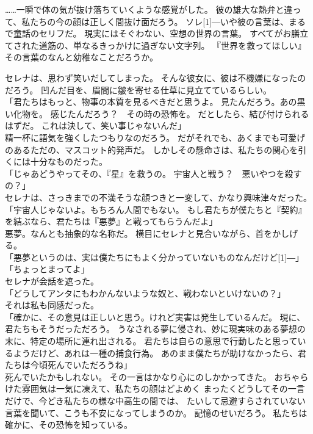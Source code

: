 \documentclass[../IHMain]{subfiles}
\begin{document}
……一瞬で体の気が抜け落ちていくような感覚がした。
彼の雄大な熱弁と違って、私たちの今の顔は正しく間抜け面だろう。
ソレ\scalebox{3}[1]{―}いや彼の言葉は、まるで童話のセリフだ。
現実にはそぐわない、空想の世界の言葉。
すべてがお膳立てされた道筋の、単なるきっかけに過ぎない文字列。
『世界を救ってほしい』その言葉のなんと幼稚なことだろうか。

セレナは、思わず笑いだしてしまった。
そんな彼女に、彼は不機嫌になったのだろう。
凹んだ目を、眉間に皺を寄せる仕草に見立てているらしい。\\
「君たちはもっと、物事の本質を見るべきだと思うよ。
見たんだろう。あの黒い化物を。
感じたんだろう？　その時の恐怖を。
だとしたら、結び付けられるはずだ。
これは決して、笑い事じゃないんだ」\\
精一杯に語気を強くしたつもりなのだろう。
だがそれでも、あくまでも可愛げのあるただの、マスコット的発声だ。
しかしその懸命さは、私たちの関心を引くには十分なものだった。\\
「じゃあどうやってその、『星』を救うの。
宇宙人と戦う？　悪いやつを殺すの？」\\
セレナは、さっきまでの不満そうな顔つきと一変して、かなり興味津々だった。\\
「宇宙人じゃないよ。もちろん人間でもない。
もし君たちが僕たちと『契約』を結ぶなら、君たちは『悪夢』と戦ってもらうんだよ」\\
悪夢。なんとも抽象的な名称だ。
横目にセレナと見合いながら、首をかしげる。\\
「悪夢というのは、実は僕たちにもよく分かっていないものなんだけど\scalebox{3}[1]{―}」\\
「ちょっとまってよ」\\
セレナが会話を遮った。\\
「どうしてアンタにもわかんないような奴と、戦わないといけないの？」\\
それは私も同感だった。\\
「確かに、その意見は正しいと思う。けれど実害は発生しているんだ。
現に、君たちもそうだっただろう。
うなされる夢に侵され、妙に現実味のある夢想の末に、特定の場所に連れ出される。
君たちは自らの意思で行動したと思っているようだけど、あれは一種の捕食行為。
あのまま僕たちが助けなかったら、君たちは今頃死んでいただろうね」\\
死んでいたかもしれない。
その一言はかなり心にのしかかってきた。
おちゃらけた雰囲気は一気に凍えて、私たちの顔はどよめく
まったくどうしてその一言だけで、今どき私たちの様な中高生の間では、
たいして忌避すらされていない言葉を聞いて、こうも不安になってしまうのか。
記憶のせいだろう。
私たちは確かに、その恐怖を知っている。\\
\end{document}
